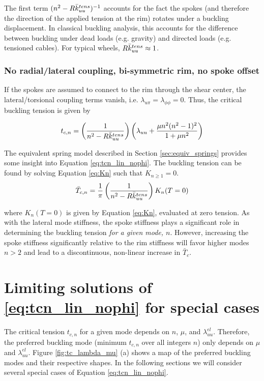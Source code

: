 \documentclass[\rootdir/thesis.tex]{subfiles}
\begin{document}
The first term $(n^2 - R\bar{k}_{uu}^{tens})^{-1}$ accounts for the fact the spokes (and therefore the direction of the applied tension at the rim) rotates under a buckling displacement. In classical buckling analysis, this accounts for the difference between buckling under dead loads (e.g. gravity) and directed loads (e.g. tensioned cables). For typical wheels, $R\bar{k}_{uu}^{tens} \approx 1$.

\inprogress

\subsubsection{No radial/lateral coupling, bi-symmetric rim, no spoke offset}
If the spokes are assumed to connect to the rim through the shear center, the lateral/torsional coupling terms vanish, i.e. $\lambda_{u\pi}=\lambda_{\phi\phi}=0$. Thus, the critical buckling tension is given by

\begin{equation}
\label{eq:tcn_lin_nophi}
t_{c,n} = \left(\frac{1}{n^2 - R\bar{k}_{uu}^{tens}}\right)
\left(\lambda_{uu}
      +\frac{\mu n^2(n^2-1)^2}
        {1 + \mu n^2}\right)
\end{equation}

The equivalent spring model described in Section \ref{sec:equiv_springs} provides some insight into Equation \eqref{eq:tcn_lin_nophi}. The buckling tension can be found by solving Equation \eqref{eq:Kn} such that $K_{n\geq 1} = 0$.
\begin{equation}
\bar{T}_{c,n} = \frac{1}{\pi}\left(\frac{1}{n^2 - R\bar{k}_{uu}^{tens}}\right) K_n(T=0)
\end{equation}

where $K_n(T=0)$ is given by Equation \eqref{eq:Kn}, evaluated at zero tension. As with the lateral mode stiffness, the spoke stiffness plays a significant role in determining the buckling tension \emph{for a given mode, $n$}. However, increasing the spoke stiffness significantly relative to the rim stiffness will favor higher modes $n > 2$ and lead to a discontinuous, non-linear increase in $\bar{T}_c$.

\section{Limiting solutions of \eqref{eq:tcn_lin_nophi} for special cases}

The critical tension $t_{c,n}$ for a given mode depends on $n$, $\mu$, and $\lambda_{uu}^{el}$. Therefore, the preferred buckling mode (minimum $t_{c,n}$ over all integers $n$) only depends on $\mu$ and $\lambda_{uu}^{el}$. Figure \ref{fig:tc_lambda_mu} (a) shows a map of the preferred buckling modes and their respective shapes. In the following sections we will consider several special cases of Equation \eqref{eq:tcn_lin_nophi}.
\end{document}

